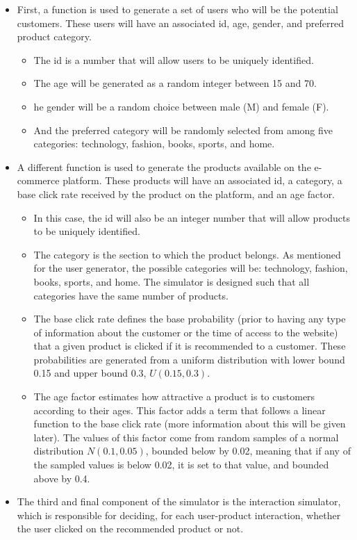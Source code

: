 \documentclass[../main.tex]{subfiles}
\begin{document}
\begin{itemize}
    \item First, a function is used to generate a set of users who will be the potential 
    customers. These users will have an associated id, age, gender, and preferred product 
    category.
    \begin{itemize}
        \item The id is a number that will allow users to be uniquely identified.
        \item The age will be generated as a random integer between 15 and 70.
        \item he gender will be a random choice between male (M) and female (F).
        \item And the preferred category will be randomly selected from among five 
        categories: technology, fashion, books, sports, and home.
    \end{itemize}
    \item A different function is used to generate the products available on the 
    e-commerce platform. These products will have an associated id, a category, 
    a base click rate received by the product on the platform, and an age factor.
    \begin{itemize}
        \item In this case, the id will also be an integer number that will allow 
        products to be uniquely identified.
        \item The category is the section to which the product belongs. As mentioned 
        for the user generator, the possible categories will be: technology, fashion, 
        books, sports, and home. The simulator is designed such that all categories 
        have the same number of products.
        \item The base click rate defines the base probability (prior to having any 
        type of information about the customer or the time of access to the website) 
        that a given product is clicked if it is recommended to a customer. These 
        probabilities are generated from a uniform distribution with lower bound 0.15 
        and upper bound 0.3, $U\left(0.15, 0.3\right)$.
        \item The age factor estimates how attractive a product is to customers 
        according to their ages. This factor adds a term that follows a linear function 
        to the base click rate (more information about this will be given later). The 
        values of this factor come from random samples of a normal distribution 
        $N\left(0.1, 0.05\right)$, bounded below by 0.02, meaning that if any of the 
        sampled values is below 0.02, it is set to that value, and bounded above by 0.4.
    \end{itemize}
    \item The third and final component of the simulator is the interaction simulator, 
    which is responsible for deciding, for each user-product interaction, whether the 
    user clicked on the recommended product or not.
\end{itemize}
\end{document}
